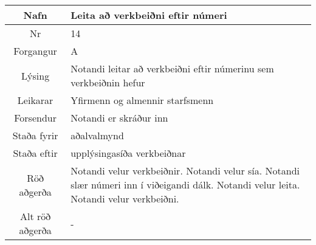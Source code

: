 \documentclass[a4paper]{article}
\begin{document}
\begin{tabular}{|c|p{10cm}|}
\hline
Nafn&Leita að verkbeiðni eftir númeri\\
\hline
Nr&14\\
\hline
Forgangur&A\\
\hline
Lýsing&Notandi leitar að verkbeiðni eftir númerinu sem verkbeiðnin hefur\\
\hline
Leikarar&Yfirmenn og almennir starfsmenn\\
\hline
Forsendur&Notandi er skráður inn\\
\hline
Staða fyrir&aðalvalmynd\\
\hline
Staða eftir&upplýsingasíða verkbeiðnar\\
\hline
Röð aðgerða&Notandi velur verkbeiðnir. Notandi velur sía. Notandi slær númeri inn í viðeigandi dálk. Notandi velur leita. Notandi velur verkbeiðni.\\
\hline
Alt röð aðgerða&-\\
\hline
\end{tabular}
\end{document}
